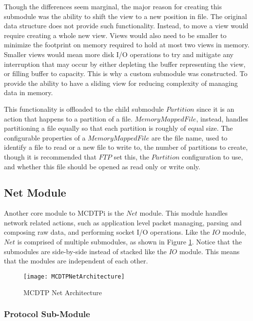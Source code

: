 Though the differences seem marginal, the major reason for creating this submodule was the ability to shift the view to a new position in file. The original data structure does not provide such functionality. Instead, to move a view would require creating a whole new view. Views would also need to be smaller to minimize the footprint on memory required to hold at most two views in memory. Smaller views would mean more disk I/O operations to try and mitigate any interruption that may occur by either depleting the buffer representing the view, or filling buffer to capacity. This is why a custom submodule was constructed. To provide the ability to have a sliding view for reducing complexity of managing data in memory.

This functionality is offloaded to the child submodule $Partition$ since it is an action that happens to a partition of a file. $MemoryMappedFile$, instead, handles partitioning a file equally so that each partition is roughly of equal size. The configurable properties of a $MemoryMappedFile$ are the file name, used to identify a file to read or a new file to write to, the number of partitions to create, though it is recommended that $FTP$ set this, the $Partition$ configuration to use, and whether this file should be opened as read only or write only.

\subsection{Net Module}\label{sec:net}

Another core module to MCDTPi is the $Net$ module. This module handles network related actions, such as application level packet managing, parsing and composing raw data, and performing socket I/O operations. Like the $IO$ module, $Net$ is comprised of multiple submodules, as shown in Figure \ref{fig:mcdtp-net-arch}. Notice that the submodules are side-by-side instead of stacked like the $IO$ module. This means that the modules are independent of each other.

\begin{figure}[ht]
\centering
\texttt{[image: MCDTPNetArchitecture]}
\caption{MCDTP Net Architecture}
\label{fig:mcdtp-net-arch}
\end{figure}

\subsubsection{Protocol Sub-Module}


